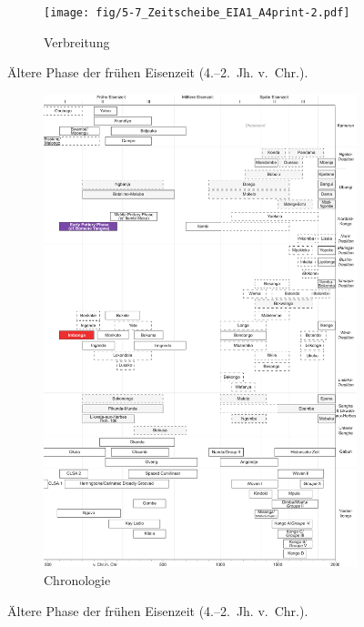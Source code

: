 \begin{figure}[p]
	\centering
	\begin{subfigure}[b]{\textwidth}
		\centering
		\texttt{[image: fig/5-7\_Zeitscheibe\_EIA1\_A4print-2.pdf]}
		\vspace{4cm}
		\caption{Verbreitung}
		\label{fig:EIA1_Karte}
	\end{subfigure}
	\caption{Ältere Phase der frühen Eisenzeit (4.--2.~Jh. v.~Chr.).}
	\label{}
\end{figure}
\addtocounter{figure}{-1}
\begin{figure}[p]
	\begin{subfigure}[b]{\textwidth}
		\setcounter{subfigure}{1}
		\centering
		\includegraphics[height = .9\textheight]{fig/Chronologiesystem_v4_Zeitscheibe_EIA1.pdf}
		\caption{Chronologie}
		\label{fig:EIA1_Chronologie}
	\end{subfigure}
	\caption{Ältere Phase der frühen Eisenzeit (4.--2.~Jh. v.~Chr.).}
	\label{fig:EIA1}
\end{figure}

